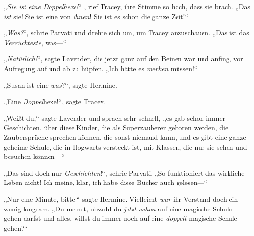 „\emph{Sie ist eine Doppelhexe!}“ , rief Tracey, ihre Stimme so hoch, dass sie brach. „Das \emph{ist} sie! Sie ist eine von \emph{ihnen}! Sie ist es schon die ganze Zeit!“

„\emph{Was?}“, schrie Parvati und drehte sich um, um Tracey anzuschauen. „Das ist das \emph{Verrückteste}, was—“

„\emph{Natürlich!}“, sagte Lavender, die jetzt ganz auf den Beinen war und anfing, vor Aufregung auf und ab zu hüpfen. „Ich hätte es \emph{merken} müssen!“

„Susan ist eine \emph{was}?“, sagte Hermine.

„Eine \emph{Doppel}{}hexe!“, sagte Tracey.

„Weißt du,“ sagte Lavender und sprach sehr schnell, „es gab schon immer Geschichten, über diese Kinder, die als Superzauberer geboren werden, die Zaubersprüche sprechen können, die sonst niemand kann, und es gibt eine ganze geheime Schule, die in Hogwarts versteckt ist, mit Klassen, die nur sie sehen und besuchen können—“

„Das sind doch nur \emph{Geschichten}!“, schrie Parvati. „So funktioniert das wirkliche Leben nicht! Ich meine, klar, ich habe diese Bücher auch gelesen—“

„Nur eine Minute, bitte,“ sagte Hermine. Vielleicht \emph{war} ihr Verstand doch ein wenig langsam. „Du meinst, obwohl du \emph{jetzt schon} auf eine magische Schule gehen darfst und alles, willst du immer noch auf eine \emph{doppelt} magische Schule gehen?“

